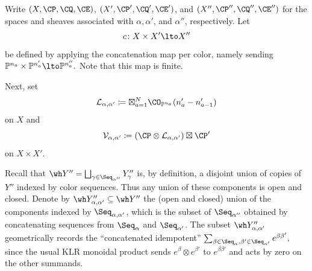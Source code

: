 \documentclass[11pt,reqno]{amsart}
\begin{document}
Write $(X,\CP,\CQ,\CE)$, $(X',\CP',\CQ',\CE')$, and
$(X'',\CP'',\CQ'',\CE'')$ for the spaces and sheaves associated with
$\alpha,\alpha'$, and $\alpha''$, respectively. Let
\[c\colon X\times X'\lto X''\] 
be defined by applying the concatenation map per color, namely sending $\BP^{n_a}\times\BP^{n_a'}\lto \BP^{n_a''}.$ Note that this map is finite.

Next, set \[\mathcal L_{\alpha,\alpha'}\coloneqq \boxtimes_{a=1}^N \CO_{\BP^{n_a}}(n'_a-n'_{a-1})\] on $X$ and \[\mathcal V_{\alpha,\alpha'}\coloneqq(\CP\otimes\mathcal L_{\alpha,\alpha'})\boxtimes\CP'\]on $X\times X'$.

Recall that $\wh Y''=\bigsqcup_{\gamma\in\Seq_{\alpha''}}Y''_\gamma$
is, by definition, a disjoint union of copies of $Y''$ indexed by
color sequences. Thus any union of these components is open and closed. Denote by $\wh Y''_{\alpha,\alpha'}\subseteq\wh Y''$ the (open and closed) union of the components indexed by $\Seq_{\alpha,\alpha'}$, which is the subset of $\Seq_{\alpha''}$ obtained by concatenating sequences from $\Seq_\alpha$ and $\Seq_{\alpha'}$. The subset $\wh Y''_{\alpha,\alpha'}$ geometrically records the ``concatenated idempotent'' $\sum_{\beta\in\Seq_\alpha,\beta'\in\Seq_{\alpha'}}e^{\beta\beta'},$ since the usual KLR monoidal product sends $e^\beta\otimes e^{\beta'}$ to $e^{\beta\beta'}$ and acts by zero on the other summands.
\end{document}
